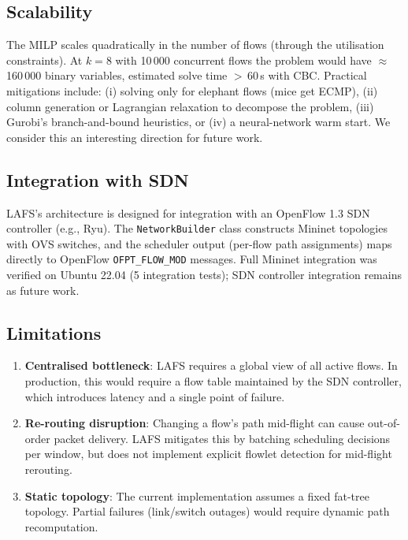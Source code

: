 \documentclass[runningheads]{llncs}
\begin{document}
\subsection{Scalability}

The MILP scales quadratically in the number of flows (through the utilisation constraints). At $k{=}8$ with 10\,000 concurrent flows the problem would have $\approx$\,160\,000 binary variables, estimated solve time $>$\,60\,s with CBC. Practical mitigations include: (i) solving only for elephant flows (mice get ECMP), (ii) column generation or Lagrangian relaxation to decompose the problem, (iii) Gurobi's branch-and-bound heuristics, or (iv) a neural-network warm start. We consider this an interesting direction for future work.

\subsection{Integration with SDN}

LAFS's architecture is designed for integration with an OpenFlow 1.3 SDN controller (e.g., Ryu). The \texttt{NetworkBuilder} class constructs Mininet topologies with OVS switches, and the scheduler output (per-flow path assignments) maps directly to OpenFlow \texttt{OFPT\_FLOW\_MOD} messages. Full Mininet integration was verified on Ubuntu 22.04 (5 integration tests); SDN controller integration remains as future work.

\subsection{Limitations}

\begin{enumerate}
  \item \textbf{Centralised bottleneck}: LAFS requires a global view of all active flows. In production, this would require a flow table maintained by the SDN controller, which introduces latency and a single point of failure.
  \item \textbf{Re-routing disruption}: Changing a flow's path mid-flight can cause out-of-order packet delivery. LAFS mitigates this by batching scheduling decisions per window, but does not implement explicit flowlet detection for mid-flight rerouting.
  \item \textbf{Static topology}: The current implementation assumes a fixed fat-tree topology. Partial failures (link/switch outages) would require dynamic path recomputation.
\end{enumerate}
\end{document}
